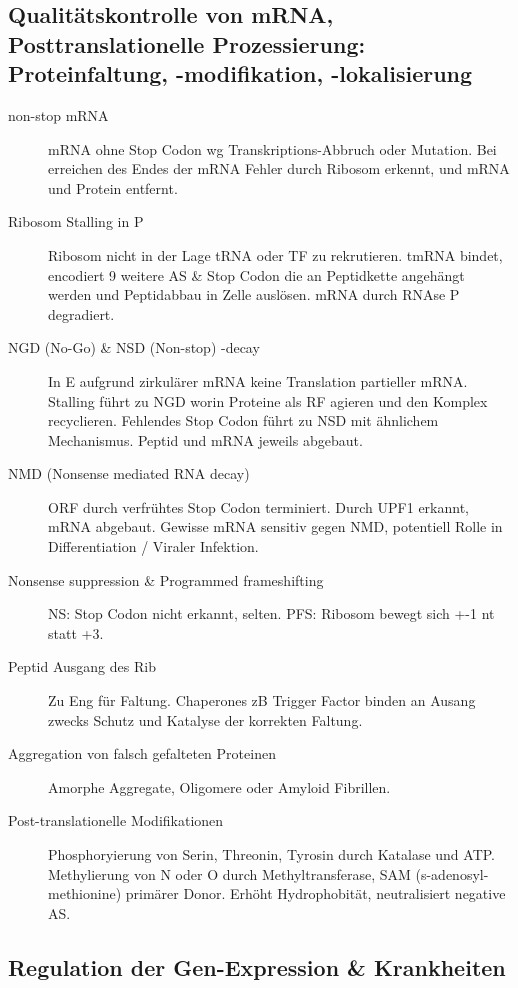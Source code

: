 \documentclass[a4paper,twocolumn,usegeometry,english,fontsize=5,DIV=28]{scrartcl}
\begin{document}
\subsection{Qualitätskontrolle von mRNA, Posttranslationelle Prozessierung:
Proteinfaltung, -modifikation, -lokalisierung}

\begin{description}
	\item[non-stop mRNA] mRNA ohne Stop Codon wg Transkriptions-Abbruch
		oder Mutation. Bei erreichen des Endes der mRNA Fehler durch
		Ribosom erkennt, und mRNA und Protein entfernt.
	\item[Ribosom Stalling in P] Ribosom nicht in der Lage tRNA oder TF zu
		rekrutieren. tmRNA bindet, encodiert 9 weitere AS \& Stop Codon
		die an Peptidkette angehängt werden und Peptidabbau in Zelle
		auslösen. mRNA durch RNAse P degradiert.
	\item[NGD (No-Go) \& NSD (Non-stop) -decay] In E aufgrund zirkulärer
		mRNA keine Translation partieller mRNA. Stalling führt zu NGD
		worin Proteine als RF agieren und den Komplex recyclieren.
		Fehlendes Stop Codon führt zu NSD mit ähnlichem Mechanismus.
		Peptid und mRNA jeweils abgebaut.
	\item[NMD (Nonsense mediated RNA decay)] ORF durch verfrühtes Stop
		Codon terminiert. Durch UPF1 erkannt, mRNA abgebaut. Gewisse
		mRNA sensitiv gegen NMD, potentiell Rolle in Differentiation /
		Viraler Infektion.
	\item[Nonsense suppression \& Programmed frameshifting] NS: Stop Codon
		nicht erkannt, selten. PFS: Ribosom bewegt sich +-1 nt statt
		+3.
	\item[Peptid Ausgang des Rib] Zu Eng für Faltung. Chaperones zB Trigger
		Factor binden an Ausang zwecks Schutz und Katalyse der
		korrekten Faltung.
	\item[Aggregation von falsch gefalteten Proteinen] Amorphe Aggregate,
		Oligomere oder Amyloid Fibrillen.
	\item[Post-translationelle Modifikationen] Phosphoryierung von Serin,
		Threonin, Tyrosin durch Katalase und ATP. Methylierung von N
		oder O durch Methyltransferase, SAM (s-adenosyl-methionine)
		primärer Donor. Erhöht Hydrophobität, neutralisiert negative
		AS.
\end{description}

\subsection{Regulation der Gen-Expression \& Krankheiten}
\end{document}
